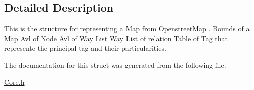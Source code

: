 \subsection{Detailed Description}
This is the structure for representing a \hyperlink{structMap}{Map} from Openstreet\-Map . \hyperlink{structBounds}{Bounds} of a \hyperlink{structMap}{Map} \hyperlink{structAvl}{Avl} of \hyperlink{structNode}{Node} \hyperlink{structAvl}{Avl} of \hyperlink{structWay}{Way} \hyperlink{structList}{List} \hyperlink{structWay}{Way} \hyperlink{structList}{List} of relation Table of \hyperlink{structTag}{Tag} that represente the principal tag and their particularities. 

The documentation for this struct was generated from the following file\-:\begin{DoxyCompactItemize}
\item 
\hyperlink{Core_8h}{Core.\-h}\end{DoxyCompactItemize}
